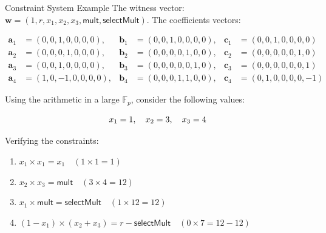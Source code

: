\documentclass{zkdl-presentation-template}
\begin{document}
    \begin{frame}[fragile]{Constraint System Example}
        The witness vector: $\boldsymbol{w} = (1, r, x_1, x_2, x_3, \mathsf{mult}, \mathsf{selectMult})$. The coefficients vectors:
        
        \vspace{-20pt}\small

        \begin{align*}
            \boldsymbol{a}_1 &= (0, 0, 1, 0, 0, 0, 0), & \boldsymbol{b}_1 &= (0, 0, 1, 0, 0, 0, 0), & \boldsymbol{c}_1 &= (0, 0, 1, 0, 0, 0, 0) \\
            \boldsymbol{a}_2 &= (0, 0, 0, 1, 0, 0, 0), & \boldsymbol{b}_2 &= (0, 0, 0, 0, 1, 0, 0), & \boldsymbol{c}_2 &= (0, 0, 0, 0, 0, 1, 0) \\
            \boldsymbol{a}_3 &= (0, 0, 1, 0, 0, 0, 0), & \boldsymbol{b}_3 &= (0, 0, 0, 0, 0, 1, 0), & \boldsymbol{c}_3 &= (0, 0, 0, 0, 0, 0, 1) \\
            \boldsymbol{a}_4 &= (1, 0, -1, 0, 0, 0, 0), & \boldsymbol{b}_4 &= (0, 0, 0, 1, 1, 0, 0), & \boldsymbol{c}_4 &= (0, 1, 0, 0, 0, 0, -1)
        \end{align*}\normalsize

        \vspace{-10pt}

        Using the arithmetic in a large $\mathbb{F}_p$, consider the following values:
        
        \vspace{-15pt}
        \begin{equation*}
            x_1 = 1, \quad x_2 = 3, \quad x_3 = 4
            \vspace{-5pt}
        \end{equation*}
    
        Verifying the constraints:
        \begin{enumerate}
            \item \( x_1 \times x_1 = x_1 \quad (1 \times 1 = 1) \)
            \item \( x_2 \times x_3 = \mathsf{mult} \quad (3 \times 4 = 12) \)
            \item \( x_1 \times \mathsf{mult} = \mathsf{selectMult} \quad (1 \times 12 = 12) \)
            \item \( (1 - x_1) \times (x_2 + x_3) = r - \mathsf{selectMult} \quad (0 \times 7 = 12 - 12) \)
        \end{enumerate}
    \end{frame}
\end{document}
